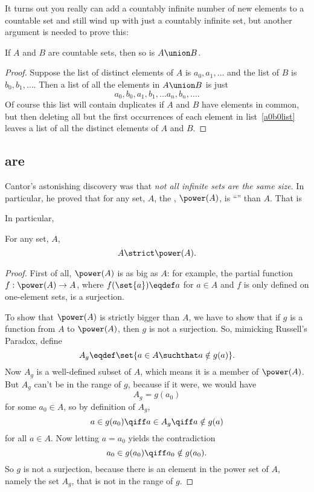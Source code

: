 It turns out you really can add a countably infinite number of new
elements to a countable set and still wind up with just a countably
infinite set, but another argument is needed to prove this:

\begin{lemma}\label{countable-union}
If $A$ and $B$ are countable sets, then so is $A \union B$.
\end{lemma}

\begin{proof}
Suppose the list of distinct elements of $A$ is $a_0,a_1,\dots$ and the
list of $B$ is $b_0,b_1, \dots$.  Then a list of all the elements in $A
\union B$ is just
\begin{equation}\label{a0b0list}
a_0,b_0,a_1,b_1, \dots a_n,b_n, \dots.
\end{equation}
Of course this list will contain duplicates if $A$ and $B$ have elements
in common, but then deleting all but the first occurrences of each element in
list~\eqref{a0b0list} leaves a list of all the distinct elements of $A$
and $B$.
\end{proof}

\subsection{ are }

\iffalse It turns out that the ideas behind \idx{Russell's Paradox}, which
caused so much trouble for the early efforts to formulate Set Theory,\fi
Cantor's astonishing discovery was that \emph{not all infinite sets are
  the same size}.  In particular, he proved that for any set, $A$, the
, $\power(A)$, is ``'' than $A$.  That is

In particular,
\begin{theorem}\label{powbig}
For any set, $A$,
\[
A \strict \power(A).
\]
\end{theorem}
\begin{proof}
  First of all, $\power(A)$ is as big as $A$: for example, the partial
  function $f:\power(A) \to A$, where $f(\set{a}) \eqdef a$ for $a \in A$
  and $f$ is only defined on one-element sets, is a surjection.

  To show that $\power(A)$ is strictly bigger than $A$, we have to show
  that if $g$ is a function from $A$ to $\power(A)$, then $g$ is not a
  surjection.  So, mimicking Russell's Paradox, define
  \[
  A_g \eqdef \set{a \in A \suchthat a \notin g(a)}.
  \]
  Now $A_g$ is a well-defined subset of $A$, which means it is a member of
  $\power(A)$.  But $A_g$ can't be in the range of $g$, because if it
  were, we would have
\[
A_g = g(a_0)
\]
for some $a_0 \in A$, so by definition of $A_g$,
\[
a \in g(a_0) \qiff a \in A_g \qiff a \notin g(a)
\]
for all $a \in A$.  Now letting $a = a_0$ yields the contradiction
\[
a_0 \in g(a_0) \qiff a_0 \notin g(a_0).
\]
So $g$ is not a surjection, because there is an element in the power set
of $A$, namely the set $A_g$, that is not in the range of $g$.
\end{proof}

